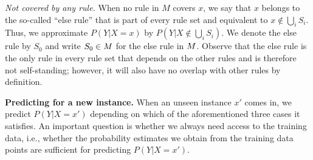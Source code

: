  
\smallskip \noindent
\emph{Not covered by any rule.}
When no rule in $M$ covers $x$, we say that $x$ belongs to the so-called ``else rule'' that is part of every rule set and equivalent to $x \notin \bigcup_{i} S_i$. Thus, we approximate $P(Y|X=x)$ by $P(Y | X \notin \bigcup_{i} S_i)$. We denote the else rule by $S_0$ and write $S_0 \in M$ for the else rule in $M$. Observe that the else rule is the only rule in every rule set that depends on the other rules and is therefore not self-standing; however, it will also have no overlap with other rules by definition.

\medskip \noindent
\textbf{Predicting for a new instance.} \label{subsubsec:new_data}
When an unseen instance $x'$ comes in, we predict $P(Y|X=x')$ depending on which of the aforementioned three cases it satisfies. An important question is whether we always need access to the training data, i.e., whether the probability estimates we obtain from the training data points are sufficient for predicting $P(Y|X=x')$.

